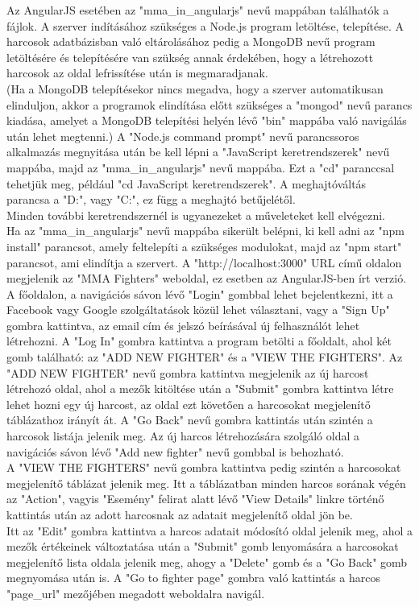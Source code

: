 Az AngularJS esetében az "mma\_in\_angularjs" nevű mappában találhatók a fájlok. A szerver indításához szükséges a Node.js program letöltése, telepítése. A harcosok adatbázisban való eltárolásához pedig a MongoDB nevű program letöltésére és telepítésére van szükség annak érdekében, hogy a létrehozott harcosok az oldal lefrissítése után is megmaradjanak. \\(Ha a MongoDB telepítésekor nincs megadva, hogy a szerver automatikusan elinduljon, akkor a programok elindítása előtt szükséges a "mongod" nevű parancs kiadása, amelyet a MongoDB telepítési helyén lévő "bin" mappába való navigálás után lehet megtenni.) A "Node.js command prompt" nevű parancssoros alkalmazás megnyitása után be kell lépni a "JavaScript keretrendszerek" nevű mappába, majd az "mma\_in\_angularjs" nevű mappába. Ezt a "cd" paranccsal tehetjük meg, például "cd JavaScript keretrendszerek". A meghajtóváltás parancsa a "D:", vagy "C:", ez függ a meghajtó betűjelétől. \\Minden további keretrendszernél is ugyanezeket a műveleteket kell elvégezni. \\Ha az "mma\_in\_angularjs" nevű mappába sikerült belépni, ki kell adni az "npm install" parancsot, amely feltelepíti a szükséges modulokat, majd az "npm start" parancsot, ami elindítja a szervert. A "http://localhost:3000" URL című oldalon megjelenik az "MMA Fighters" weboldal, ez esetben az AngularJS-ben írt verzió.\\
A főoldalon, a navigációs sávon lévő "Login" gombbal lehet bejelentkezni, itt a Facebook vagy Google szolgáltatások közül lehet választani, vagy a "Sign Up" gombra kattintva, az email cím és jelszó beírásával új felhasználót lehet létrehozni. A "Log In" gombra kattintva a program betölti a főoldalt, ahol két gomb található: az "ADD NEW FIGHTER" és a "VIEW THE FIGHTERS". Az "ADD NEW FIGHTER" nevű gombra kattintva megjelenik az új harcost létrehozó oldal, ahol a mezők kitöltése után a "Submit" gombra kattintva létre lehet hozni egy új harcost, az oldal ezt követően a harcosokat megjelenítő táblázathoz irányít át. A "Go Back" nevű gombra kattintás után szintén a harcosok listája jelenik meg. Az új harcos létrehozására szolgáló oldal a navigációs sávon lévő "Add new fighter" nevű gombbal is behozható. \\A "VIEW THE FIGHTERS" nevű gombra kattintva pedig szintén a harcosokat megjelenítő táblázat jelenik meg. Itt a táblázatban minden harcos sorának végén az "Action", vagyis "Esemény" felirat alatt lévő "View Details" linkre történő kattintás után az adott harcosnak az adatait megjelenítő oldal jön be. \\Itt az "Edit" gombra kattintva a harcos adatait módosító oldal jelenik meg, ahol a mezők értékeinek változtatása után a "Submit" gomb lenyomására a harcosokat megjelenítő lista oldala jelenik meg, ahogy a "Delete" gomb és a "Go Back" gomb megnyomása után is. A "Go to fighter page" gombra való kattintás a harcos "page\_url" mezőjében megadott weboldalra navigál.
